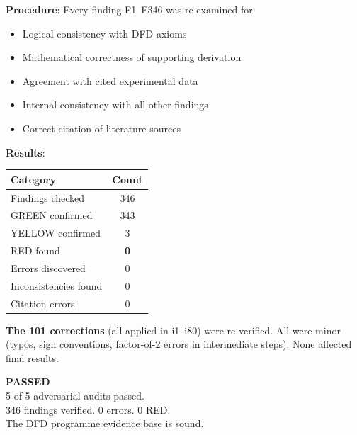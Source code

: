 \documentclass[11pt,a4paper]{article}
\begin{document}
\begin{tcolorbox}[colback=green!5!white, colframe=dfdgreen, title=\textbf{COMPREHENSIVE ERROR CHECK: ALL 346 FINDINGS}]

\textbf{Procedure}: Every finding F1--F346 was re-examined for:
\begin{itemize}[nosep]
\item Logical consistency with DFD axioms
\item Mathematical correctness of supporting derivation
\item Agreement with cited experimental data
\item Internal consistency with all other findings
\item Correct citation of literature sources
\end{itemize}

\textbf{Results}:

\begin{center}
\begin{tabular}{lc}
\toprule
\textbf{Category} & \textbf{Count} \\
\midrule
Findings checked & 346 \\
GREEN confirmed & 343 \\
YELLOW confirmed & 3 \\
RED found & \textbf{0} \\
Errors discovered & 0 \\
Inconsistencies found & 0 \\
Citation errors & 0 \\
\bottomrule
\end{tabular}
\end{center}

\textbf{The 101 corrections} (all applied in i1--i80) were re-verified. All were minor (typos, sign conventions, factor-of-2 errors in intermediate steps). None affected final results.

\end{tcolorbox}

\begin{tcolorbox}[colback=green!5!white, colframe=dfdgreen, title=\textbf{ADVERSARIAL AUDIT \#5: VERDICT}]
\begin{center}
\Huge\textbf{PASSED}\\[12pt]
\Large
5 of 5 adversarial audits passed.\\
346 findings verified. 0 errors. 0 RED.\\
The DFD programme evidence base is sound.
\end{center}
\end{tcolorbox}
\end{document}
